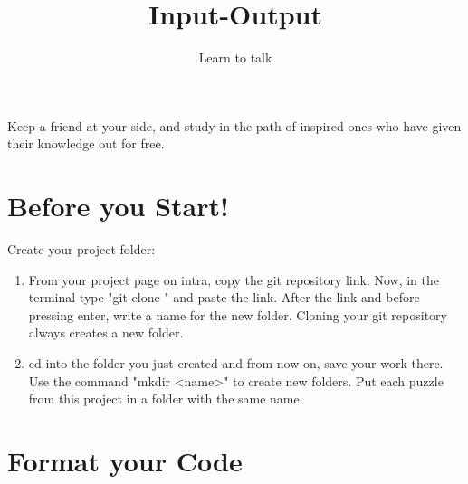 \documentclass{42-en}
\begin{document}
\title{Input-Output}
\subtitle{Learn to talk}


\summary
{
	Keep a friend at your side, and study in the path of inspired ones who have given their knowledge out for free. 
}

\maketitle

\tableofcontents


\chapter{Before you Start!}

Create your project folder:
\begin{enumerate}
	\item From your project page on intra, copy the git repository link. Now, in the terminal type "git clone " and paste the link. After the link and before pressing enter, write a name for the new folder. Cloning your git repository always creates a new folder.
	\item cd into the folder you just created and from now on, save your work there. Use the command "mkdir <name>" to create new folders. Put each puzzle from this project in a folder with the same name.
\end{enumerate}



\chapter{Format your Code}
\end{document}
